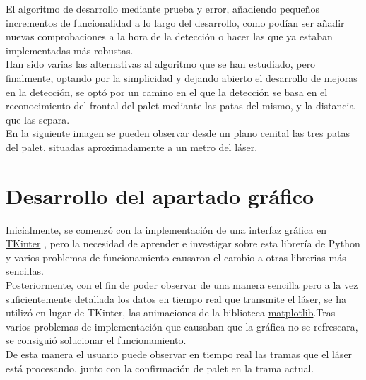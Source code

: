 		El algoritmo de desarrollo mediante prueba y error, añadiendo pequeños incrementos de funcionalidad a lo largo del desarrollo, como podían ser añadir nuevas comprobaciones a la hora de la detección o hacer las que ya estaban implementadas más robustas.\\

		Han sido varias las alternativas al algoritmo que se han estudiado, pero finalmente, optando por la simplicidad y dejando abierto el desarrollo de mejoras en la detección, se optó por un camino en el que la detección se basa en el reconocimiento del frontal del palet mediante las patas del mismo, y la distancia que las separa.\\
En la siguiente imagen se pueden observar desde un plano cenital las tres patas del palet, situadas aproximadamente a un metro del láser.




\section{Desarrollo del apartado gráfico}

		Inicialmente, se comenzó con la implementación de una interfaz gráfica en \href{https://docs.python.org/2/library/tkinter.html}{TKinter}
, pero la necesidad de aprender e investigar sobre esta librería de Python y varios problemas de funcionamiento causaron el cambio a otras librerias más sencillas.\\
Posteriormente, con el fin de poder observar de una manera sencilla pero a la vez suficientemente detallada los datos en tiempo real que transmite el láser, se ha utilizó en lugar de TKinter, las animaciones de la biblioteca \href{https://matplotlib.org/}{matplotlib}.Tras varios problemas de implementación que causaban que la gráfica no se refrescara, se consiguió solucionar el funcionamiento.\\ De esta manera el usuario puede observar en tiempo real las tramas que el láser está procesando, junto con la confirmación de palet en la trama actual. 



